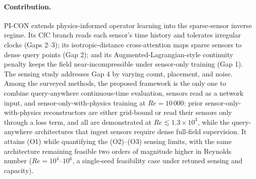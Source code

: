 \paragraph{Contribution.}
PI-CON extends physics-informed operator learning into the sparse-sensor inverse regime. Its CfC branch reads each sensor's time history and tolerates irregular clocks (Gaps 2--3); its isotropic-distance cross-attention maps sparse sensors to dense query points (Gap 2); and its Augmented-Lagrangian-style continuity penalty keeps the field near-incompressible under sensor-only training (Gap 1). The sensing study addresses Gap 4 by varying count, placement, and noise. Among the surveyed methods, the proposed framework is the only one to combine query-anywhere continuous-time evaluation, sensors read as a network input, and sensor-only-with-physics training at $Re = 10\,000$: prior sensor-only-with-physics reconstructors are either grid-bound or read their sensors only through a loss term, and all are demonstrated at $Re \lesssim 1.3\times10^3$, while the query-anywhere architectures that ingest sensors require dense full-field supervision. It attains (O1) while quantifying the (O2)--(O3) sensing limits, with the same architecture remaining feasible two orders of magnitude higher in Reynolds number ($Re = 10^4$--$10^6$, a single-seed feasibility case under retuned sensing and capacity).
